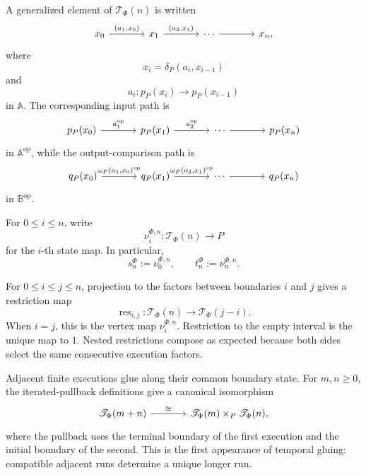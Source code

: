 A generalized element of \(\mathscr T_\Phi(n)\) is written
\[
\begin{tikzcd}[column sep=large]
    x_0
        \arrow[r, "{(a_1,x_0)}"]
    &
    x_1
        \arrow[r, "{(a_2,x_1)}"]
    &
    \cdots
        \arrow[r]
    &
    x_n,
\end{tikzcd}
\]
where
\[
    x_i=\delta_P(a_i,x_{i-1})
\]
and
\[
    a_i:p_P(x_i)\to p_P(x_{i-1})
\]
in \(\mathbb A\). The corresponding input path is
\[
\begin{tikzcd}[column sep=large]
    p_P(x_0)
        \arrow[r, "a_1^{\mathrm{op}}"]
    &
    p_P(x_1)
        \arrow[r, "a_2^{\mathrm{op}}"]
    &
    \cdots
        \arrow[r]
    &
    p_P(x_n)
\end{tikzcd}
\]
in \(\mathbb A^{\mathrm{op}}\), while the output-comparison path is
\[
\begin{tikzcd}[column sep=large]
    q_P(x_0)
        \arrow[r, "{\omega_P(a_1,x_0)^{\mathrm{op}}}"]
    &
    q_P(x_1)
        \arrow[r, "{\omega_P(a_2,x_1)^{\mathrm{op}}}"]
    &
    \cdots
        \arrow[r]
    &
    q_P(x_n)
\end{tikzcd}
\]
in \(\mathbb B^{\mathrm{op}}\).

For \(0\leq i\leq n\), write
\[
    \nu_i^{\Phi,n}:
    \mathscr T_\Phi(n)\to P
\]
for the \(i\)-th state map. In particular,
\[
    s_n^\Phi:=\nu_0^{\Phi,n},
    \qquad
    t_n^\Phi:=\nu_n^{\Phi,n}.
\]

For \(0\leq i\leq j\leq n\), projection to the factors between boundaries
\(i\) and \(j\) gives a restriction map
\[
    \operatorname{res}_{i,j}:
    \mathscr T_\Phi(n)
    \longrightarrow
    \mathscr T_\Phi(j-i).
\]
When \(i=j\), this is the vertex map \(\nu_i^{\Phi,n}\). Restriction to the
empty interval is the unique map to \(1\). Nested restrictions compose as
expected because both sides select the same consecutive execution factors.

Adjacent finite executions glue along their common boundary state. For
\(m,n\geq0\), the iterated-pullback definitions give a canonical isomorphism
\[
\begin{tikzcd}[column sep=large]
    \mathscr T_\Phi(m+n)
        \arrow[r, "\cong"]
    &
    \mathscr T_\Phi(m)
        \times_{P}
    \mathscr T_\Phi(n),
\end{tikzcd}
\]
where the pullback uses the terminal boundary of the first execution and the
initial boundary of the second. This is the first appearance of temporal
gluing: compatible adjacent runs determine a unique longer run.

